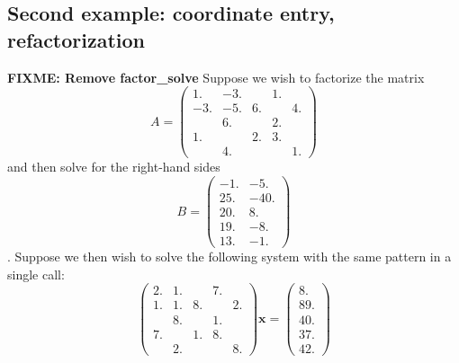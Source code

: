 \documentclass{spral}
\begin{document}
\subsection{Second example: coordinate entry, refactorization}
{\bf FIXME: Remove factor\_solve}
Suppose we wish to factorize the matrix
\[ A = \left(
\begin{array}{ccccc}
1. & -3. & & 1. \\
-3. & -5. & 6. & & 4.\\
& 6. & & 2. \\
1. & & 2. & 3. \\
& 4. & & & 1.
\end{array}
\right)
\]
and then solve for the right-hand sides
\[ B = \left(
\begin{array}{cc}
-1. & -5.\\
25. & -40. \\
20. & 8. \\
19. & -8. \\
13. & -1.
\end{array}
\right)
\].
Suppose we then wish to solve the following system with the same pattern in a
single call:
\[ \left(
\begin{array}{ccccc}
2. & 1. & & 7. \\
1. & 1. & 8. & & 2.\\
& 8. & & 1. \\
7. & & 1. & 8. \\
& 2. & & & 8.
\end{array}
\right) \mathbf{x} = \left(
\begin{array}{c}
8. \\
89. \\
40. \\
37. \\
42.
\end{array}
\right)
\]
\end{document}
